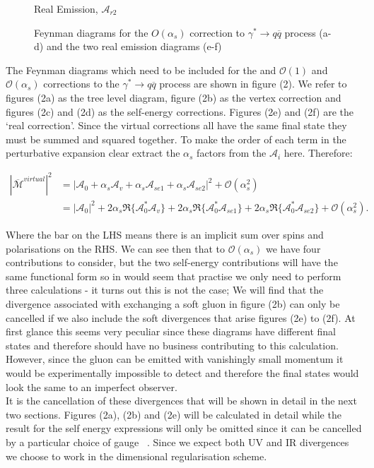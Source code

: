\begin{figure}[tpb]
\begin{minipage}{0.4\linewidth}
				\caption{Real Emission, $\mathcal{A}_{r2}$}
			\end{minipage}
		\caption{Feynman diagrams for the $O(\alpha_s)$ correction to $\gamma^*\rightarrow q\overline{q}$
		process (a-d) and the two real emission diagrams (e-f)}\label{fig:NLOContributions}
	\end{figure}

	The Feynman diagrams which need to be included for the and $\mathcal{O}(1)$ and $\mathcal{O}(\alpha_s)$ corrections to the
	$\gamma^*\rightarrow q\overline{q}$ process are shown in figure (2).  We refer to figures (2a) as the tree level diagram,
	figure (2b) as the vertex correction and figures (2c) and (2d) as the self-energy corrections.  Figures (2e) and (2f) are
	the `real correction'.  Since the virtual corrections all have the same final state they must be summed and squared together.
	To make the order of each term in the perturbative expansion clear extract the $\alpha_s$ factors from the $\mathcal{A}_i$ here.  Therefore:

	\begin{equation}
	\begin{split}
	|\overline{\mathcal{M}}^{virtual}|^2 &= |\mathcal{A}_0 + \alpha_s\mathcal{A}_v + \alpha_s\mathcal{A}_{se1} + \alpha_s\mathcal{A}_{se2}|^2 + \mathcal{O}(\alpha_s^2) \\
	&= |\mathcal{A}_0|^2 + 2\alpha_s\Re\{\mathcal{A}^*_0\mathcal{A}_v\} + 2\alpha_s\Re\{\mathcal{A}^*_0\mathcal{A}_{se1}\} + 2\alpha_s\Re\{\mathcal{A}^*_0\mathcal{A}_{se2}\} + \mathcal{O}(\alpha_s^2).
	\end{split}
	\end{equation}

	Where the bar on the LHS means there is an implicit sum over spins and polarisations on the RHS.  We can see then that to
	$\mathcal{O}(\alpha_s)$ we have four contributions to consider, but the two self-energy contributions will have the same
	functional form so in would seem that practise we only need to perform three calculations - it turns out this is not the case;
	We will find that the divergence associated with exchanging a soft gluon in figure (2b) can only be cancelled if we also
	include the soft divergences that arise figures (2e) to (2f).  At first glance this seems very peculiar since these diagrams
	have different final states and therefore should have no business contributing to this calculation.  However, since the gluon
	can be emitted with vanishingly small momentum it would be experimentally impossible to detect and therefore the final states
	would look the same to an imperfect observer.\\It is the cancellation of these divergences that will be shown in detail
	in the next two sections.  Figures (2a), (2b) and (2e) will be calculated in detail while the result for the self energy
	expressions will only be omitted since it can be cancelled by a particular choice of gauge ~\cite{field}.  Since we
	expect both UV and IR divergences we choose to work in the dimensional regularisation scheme.

